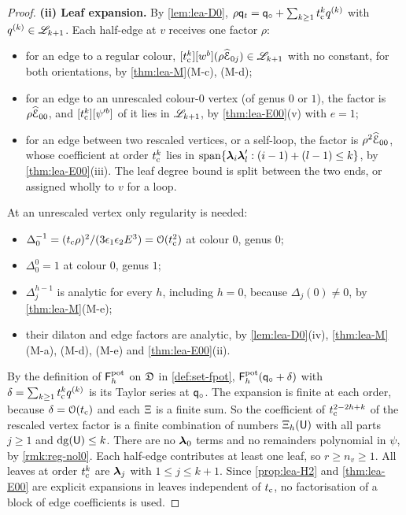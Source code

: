 \begin{proof}
\medskip\noindent\textbf{(ii) Leaf expansion.} By \cref{lem:lea-D0}, $\rho\mathsf{q}_{t}=\mathsf{q}_{\circ}+\sum_{k\geq 1}t_{\mathrm{c}}^k q^{(k)}$ with $q^{(k)}\in\mathscr{L}_{k+1}$. Each half-edge at $v$ receives one factor $\rho$:
\begin{itemize}
\item for an edge to a regular colour, $[t_{\mathrm{c}}^k][w^b](\rho\widehat{\mathcal{E}}_{0j})\in\mathscr{L}_{k+1}$ with no constant, for both orientations, by \cref{thm:lea-M}(M-c), (M-d);
\item for an edge to an unrescaled colour-$0$ vertex (of genus $0$ or $1$), the factor is $\rho\widehat{\mathcal{E}}_{00}$, and $[t_{\mathrm{c}}^k][\psi'^b]$ of it lies in $\mathscr{L}_{k+1}$, by \cref{thm:lea-E00}(v) with $e=1$;
\item for an edge between two rescaled vertices, or a self-loop, the factor is $\rho^2\widehat{\mathcal{E}}_{00}$, whose coefficient at order $t_{\mathrm{c}}^k$ lies in $\mathrm{span}\{\boldsymbol{\lambda}_i\boldsymbol{\lambda}_l':(i-1)+(l-1)\leq k\}$, by \cref{thm:lea-E00}(iii). The leaf degree bound is split between the two ends, or assigned wholly to $v$ for a loop.
\end{itemize}
At an unrescaled vertex only regularity is needed:
\begin{itemize}
\item $\Delta_0^{-1}=(t_{\mathrm{c}}\rho)^2/(3\epsilon_1\epsilon_2E^3)=\mathcal{O}(t_{\mathrm{c}}^2)$ at colour $0$, genus $0$;
\item $\Delta_0^{0}=1$ at colour $0$, genus $1$;
\item $\Delta_j^{h-1}$ is analytic for every $h$, including $h=0$, because $\Delta_j(0)\neq 0$, by \cref{thm:lea-M}(M-e);
\item their dilaton and edge factors are analytic, by \cref{lem:lea-D0}(iv), \cref{thm:lea-M}(M-a), (M-d), (M-e) and \cref{thm:lea-E00}(ii).
\end{itemize}
By the definition of $\mathsf{F}^{\mathrm{pot}}_h$ on $\mathfrak{D}$ in \cref{def:set-fpot}, $\mathsf{F}^{\mathrm{pot}}_h(\mathsf{q}_{\circ}+\delta)$ with $\delta=\sum_{k\geq 1}t_{\mathrm{c}}^kq^{(k)}$ is its Taylor series at $\mathsf{q}_{\circ}$. The expansion is finite at each order, because $\delta=\mathcal{O}(t_{\mathrm{c}})$ and each $\Xi$ is a finite sum. So the coefficient of $t_{\mathrm{c}}^{2-2h+k}$ of the rescaled vertex factor is a finite combination of numbers $\Xi_h(\mathsf{U})$ with all parts $j\geq 1$ and $\mathrm{dg}(\mathsf{U})\leq k$. There are no $\boldsymbol{\lambda}_0$ terms and no remainders polynomial in $\psi$, by \cref{rmk:reg-nol0}. Each half-edge contributes at least one leaf, so $r\geq n_{v}\geq 1$. All leaves at order $t_{\mathrm{c}}^k$ are $\boldsymbol{\lambda}_j$ with $1\leq j\leq k+1$. Since \cref{prop:lea-H2} and \cref{thm:lea-E00} are explicit expansions in leaves independent of $t_{\mathrm{c}}$, no factorisation of a block of edge coefficients is used.


\end{proof}
